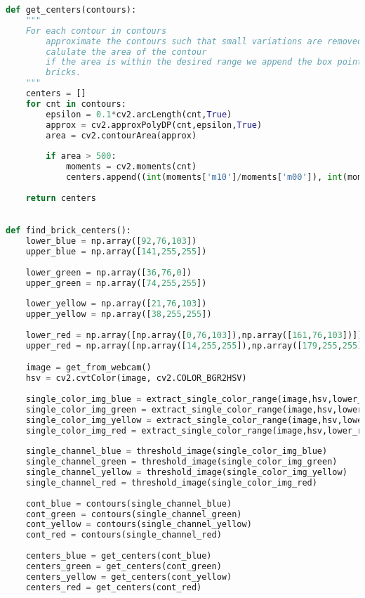 \begin{lstlisting}[language=Python]
def get_centers(contours):
    """
    For each contour in contours
        approximate the contours such that small variations are removed
        calulate the area of the contour
        if the area is within the desired range we append the box points to the
        bricks.
    """
    centers = []
    for cnt in contours:
        epsilon = 0.1*cv2.arcLength(cnt,True)
        approx = cv2.approxPolyDP(cnt,epsilon,True)
        area = cv2.contourArea(approx)
        
        if area > 500:
            moments = cv2.moments(cnt)
            centers.append((int(moments['m10']/moments['m00']), int(moments['m01']/moments['m00'])))
    
    return centers
    

def find_brick_centers():    
    lower_blue = np.array([92,76,103])
    upper_blue = np.array([141,255,255])
    
    lower_green = np.array([36,76,0])
    upper_green = np.array([74,255,255])
    
    lower_yellow = np.array([21,76,103])
    upper_yellow = np.array([38,255,255])
    
    lower_red = np.array([np.array([0,76,103]),np.array([161,76,103])])
    upper_red = np.array([np.array([14,255,255]),np.array([179,255,255])])

    image = get_from_webcam()
    hsv = cv2.cvtColor(image, cv2.COLOR_BGR2HSV)
    
    single_color_img_blue = extract_single_color_range(image,hsv,lower_blue,upper_blue)
    single_color_img_green = extract_single_color_range(image,hsv,lower_green,upper_green)
    single_color_img_yellow = extract_single_color_range(image,hsv,lower_yellow,upper_yellow)
    single_color_img_red = extract_single_color_range(image,hsv,lower_red,upper_red)
        
    single_channel_blue = threshold_image(single_color_img_blue)
    single_channel_green = threshold_image(single_color_img_green)
    single_channel_yellow = threshold_image(single_color_img_yellow)
    single_channel_red = threshold_image(single_color_img_red)
    
    cont_blue = contours(single_channel_blue)
    cont_green = contours(single_channel_green)
    cont_yellow = contours(single_channel_yellow)
    cont_red = contours(single_channel_red)
    
    centers_blue = get_centers(cont_blue)
    centers_green = get_centers(cont_green)
    centers_yellow = get_centers(cont_yellow)
    centers_red = get_centers(cont_red)
    

\end{lstlisting}
